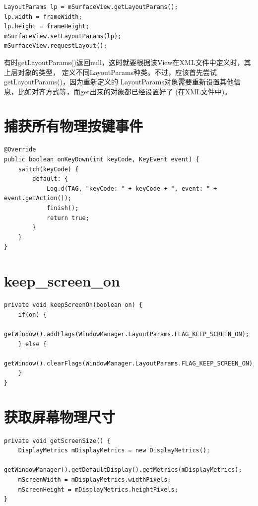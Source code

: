 ﻿\documentclass[a4paper,11pt]{article}
\begin{document}
\begin{verbatim}
LayoutParams lp = mSurfaceView.getLayoutParams();
lp.width = frameWidth;
lp.height = frameHeight;
mSurfaceView.setLayoutParams(lp);
mSurfaceView.requestLayout();
\end{verbatim}

  有时getLayoutParams()返回null，这时就要根据该View在XML文件中定义时，其上层对象的类型，
  定义不同LayoutParams种类。不过，应该首先尝试getLayoutParams()，因为重新定义的
  LayoutParams对象需要重新设置其他信息，比如对齐方式等，而get出来的对象都已经设置好了
  (在XML文件中)。

  \section[捕获所有物理按键事件]{捕获所有物理按键事件}
  \begin{verbatim}
@Override
public boolean onKeyDown(int keyCode, KeyEvent event) {
    switch(keyCode) {
        default: {
            Log.d(TAG, "keyCode: " + keyCode + ", event: " + event.getAction());
            finish();
            return true;
        }
    }
}
  \end{verbatim}

  \section[keep\_screen\_on]{keep\_screen\_on}
  \begin{verbatim}
private void keepScreenOn(boolean on) {
    if(on) {
        getWindow().addFlags(WindowManager.LayoutParams.FLAG_KEEP_SCREEN_ON);
    } else {
        getWindow().clearFlags(WindowManager.LayoutParams.FLAG_KEEP_SCREEN_ON);
    }
}
  \end{verbatim}

  \section[获取屏幕物理尺寸]{获取屏幕物理尺寸}
  \begin{verbatim}
private void getScreenSize() {
    DisplayMetrics mDisplayMetrics = new DisplayMetrics();
    getWindowManager().getDefaultDisplay().getMetrics(mDisplayMetrics);
    mScreenWidth = mDisplayMetrics.widthPixels;
    mScreenHeight = mDisplayMetrics.heightPixels;
}
  \end{verbatim}
\end{document}
